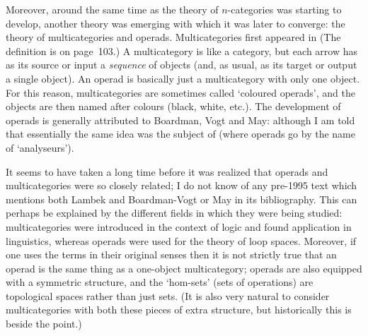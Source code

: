Moreover, around the same time as the theory of $n$-categories was starting
to develop, another theory was emerging with which it was later to converge:
the theory of multicategories and operads.  Multicategories first appeared in
% 
%
% 
(The definition is on page~103.)  A multicategory is like a category, but
each arrow has as its source or input a \emph{sequence} of objects (and, as
usual, as its target or output a single object).  An operad is basically just
a multicategory with only one object.  For this reason, multicategories are
sometimes called `coloured operads', and the objects are then named after
colours (black, white, etc.).  The development of operads is generally
attributed to Boardman, Vogt and May:
% 
%
% 
% 
%
% 
although I am told that essentially the same idea was the subject of 
% 
%
% 
(where operads go by the name of `analyseurs').

It seems to have taken a long time before it was realized that operads and
multicategories were so closely related; I do not know of any pre-1995 text
which mentions both Lambek and Boardman-Vogt or May in its bibliography.
This can perhaps be explained by the different fields in which they were
being studied: multicategories were introduced in the context of logic and
found application in linguistics, whereas operads were used for the theory of
loop spaces.  Moreover, if one uses the terms in their original senses then
it is not strictly true that an operad is the same thing as a one-object
multicategory; operads are also equipped with a symmetric structure, and the
`hom-sets' (sets of operations) are topological spaces rather than just sets.
(It is also very natural to consider multicategories with both these pieces
of extra structure, but historically this is beside the point.)

